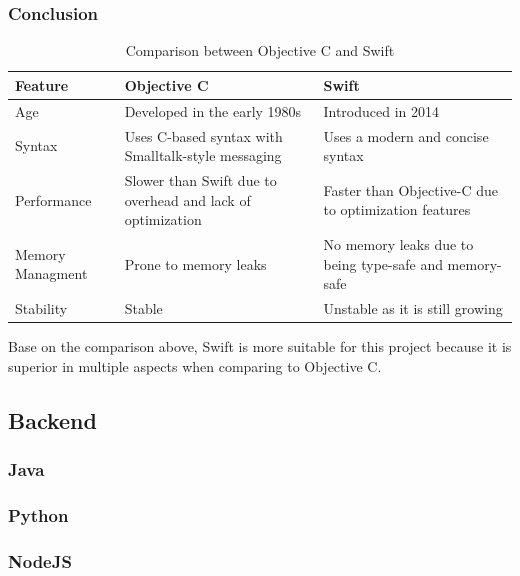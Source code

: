 \subsubsection{Conclusion}

\begin{table}[H]
    \centering
    \begin{tabular}{| >{\centering\arraybackslash}m{2cm} | >{\centering\arraybackslash}m{6cm} | >{\centering\arraybackslash}m{6cm} |}
        \hline
        \textbf{Feature} & \textbf{Objective C} & \textbf{Swift} \\ \hline
        Age & Developed in the early 1980s & Introduced in 2014 \\ \hline
        Syntax & Uses C-based syntax with Smalltalk-style messaging & Uses a modern and concise syntax \\ \hline
        Performance & Slower than Swift due to overhead and lack of optimization & Faster than Objective-C due to optimization features \\ \hline
        Memory Managment & Prone to memory leaks & No memory leaks due to being type-safe and memory-safe \\ \hline
        Stability & Stable & Unstable as it is still growing \\ \hline
    \end{tabular}
    \caption{Comparison between Objective C and Swift}
\end{table}

Base on the comparison above, Swift is more suitable for this project because it is superior in multiple aspects when comparing to Objective C.

\subsection{Backend}

\subsubsection{Java}



\subsubsection{Python}


\subsubsection{NodeJS}

